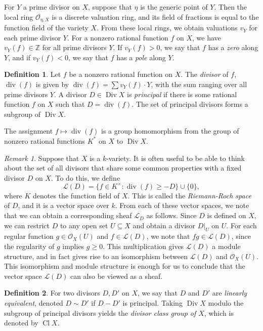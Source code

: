 \documentclass[12pt,twoside]{reedthesis}
\theoremstyle{plain}
\theoremstyle{definition}
\newtheorem{definition}{Definition}[section]
\theoremstyle{remark}
\newtheorem{remark}{Remark}[section]
\newcommand{\ZZ}{\mathbb{Z}}
\newcommand{\calO}{\mathcal{O}}
\newcommand{\Div}{\operatorname{Div}}
\newcommand{\Cl}{\operatorname{Cl}}
\renewcommand{\div}{\operatorname{div}}
\begin{document}
For $Y$ a prime divisor on $X$, suppose that $\eta$ is the generic point of $Y$. Then the local ring $\calO_{\eta, X}$ is a discrete valuation ring, and its field of fractions is equal to the function field of the variety $X$. From these local rings, we obtain valuations $v_Y$ for each prime divisor $Y$. For a nonzero  rational function $f$ on $X$, we have $v_Y(f)\in\ZZ$ for all prime divisors $Y$. If $v_Y(f)>0$, we say that $f$ has a \emph{zero} along $Y$, and if $v_Y(f)<0$, we say that $f$ has a \emph{pole} along $Y$.

\begin{definition}
Let $f$ be a nonzero rational function on $X$. The \emph{divisor} of $f$, $\div(f)$ is given by $\div(f)=\sum v_Y(f)\cdot Y$, with the sum ranging over all prime divisors $Y$. A divisor $D\in\Div X$ is \emph{principal} if there is some rational function $f$ on $X$ such that $D=\div(f)$. The set of principal divisors forms a subgroup of $\Div X$.
\end{definition}

\noindent The assignment $f\mapsto\div(f)$ is a group homomorphism from the group of nonzero rational functions $K^*$ on $X$ to $\Div X$. 

\begin{remark}
Suppose that $X$ is a $k$-variety. It is often useful to be able to think about the set of all divisors that share some common properties with a fixed divisor $D$ on $X$. To do this, we define \[\mathcal{L}(D)=\{f\in K^\times: \div(f)\geq -D\}\cup\{0\},\] where $K$ denotes the function field of $X$. This is called the \emph{Riemann-Roch space} of $D$, and it is a vector space over $k$. From each of these vector spaces, we note that we can obtain a corresponding sheaf $\mathcal{L}_D$ as follows. Since $D$ is defined on $X$, we can restrict $D$ to any open set $U\subseteq X$ and obtain a divisor $D|_U$ on $U$. For each regular function $g\in\calO_X(U)$ and $f\in\mathcal{L}(D)$, we note that $fg\in\mathcal{L}(D)$, since the regularity of $g$ implies $g\geq0$. This multiplication gives $\mathcal{L}(D)$ a module structure, and in fact gives rise to an isomorphism between $\mathcal{L}(D)$ and $\calO_X(U)$. This isomorphism and module structure is enough for us to conclude that the vector space $\mathcal{L}(D)$ can also be viewed as a sheaf.
\end{remark}

\begin{definition}
For two divisors $D,D'$ on $X$, we say that $D$ and $D'$ are \emph{linearly equivalent}, denoted $D\sim D'$ if $D-D'$ is principal. Taking $\Div X$ modulo the subgroup of principal divisors yields the \emph{divisor class group of $X$}, which is denoted by $\Cl X$.
\end{definition}
\end{document}
